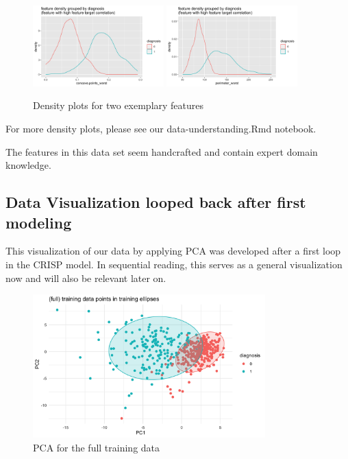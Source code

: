 \documentclass[]{article}
\begin{document}
\begin{figure}
    \centering
    \includegraphics[width=0.45\textwidth]{images/density2.png}
    \includegraphics[width=0.45\textwidth]{images/density3.png}
    \caption{Density plots for two exemplary features}
    \label{fig:densities}
\end{figure}

For more density plots, please see our data-understanding.Rmd notebook.

The features in this data set seem handcrafted and contain expert domain
knowledge.

\subsection{Data Visualization looped back after first
modeling}\label{data-visualization-looped-back-after-first-modeling}

This visualization of our data by applying PCA was developed after a
first loop in the CRISP model. In sequential reading, this serves as a
general visualization now and will also be relevant later on.

\begin{figure}
    \centering
    \includegraphics[width=0.8\textwidth]{images/A-training-full-PCA.png}
    \caption{PCA for the full training data}
    \label{fig:A-training-full-PCA}
\end{figure}
\end{document}

